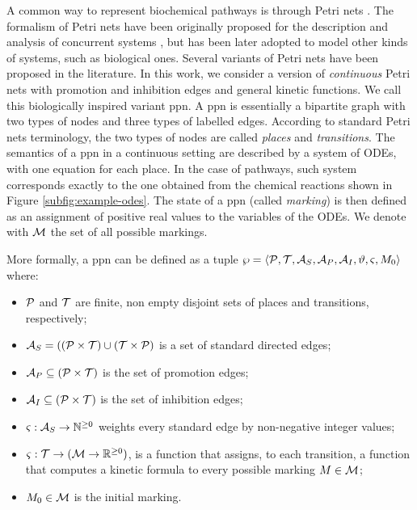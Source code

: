 

A common way to represent biochemical pathways is through Petri nets \cite{?}. The formalism of Petri nets have been originally proposed for the description and analysis of concurrent systems \cite{?}, but has been later adopted to model other kinds of systems, such as biological ones. Several variants of Petri nets have been proposed in the literature. In this work, we consider a version of \emph{continuous} Petri nets \cite{?} with promotion and inhibition edges and general kinetic functions. We call this biologically inspired variant \gls{ppn}. A \gls{ppn} is essentially a bipartite graph with two types of nodes and three types of labelled edges. According to standard Petri nets terminology, the two types of nodes are called \emph{places} and \emph{transitions}. The semantics of a \gls{ppn} in a continuous setting are described by a system of ODEs, with one equation for each place. In the case of pathways, such system corresponds exactly to the one obtained from the chemical reactions shown in Figure \ref{subfig:example-odes}. The state of a \gls{ppn} (called \emph{marking}) is then defined as an assignment of positive real values to the variables of the ODEs. We denote with $\Cal{M}$ the set of all possible markings.

More formally, a \gls{ppn} can be defined as a tuple $\wp = \Tuple{\Cal{P},\Cal{T},\Cal{A}_{S}, \Cal{A}_{P},\Cal{A}_{I},\vartheta,\varsigma,M_0}$ where:
\begin{itemize}
    \item $\Cal{P}$ and $\Cal{T}$ are finite, non empty disjoint sets of places and transitions, respectively;
    \item $\Cal{A}_{S} = ((\Cal{P}\times \Cal{T}) \cup (\Cal{T}\times \Cal{P})$ is a set of standard directed edges;
    \item $\Cal{A}_{P} \subseteq (\Cal{P} \times \Cal{T})$ is the set of promotion edges;
    \item $\Cal{A}_{I} \subseteq (\Cal{P} \times \Cal{T})$ is the set of inhibition edges;
    \item $\varsigma: \Cal{A}_{S} \shortrightarrow \mathbb{N}^{\geq 0}$ weights every standard edge by non-negative integer values;
    \item $\varsigma:\Cal{T} \shortrightarrow (\Cal{M} \rightarrow \mathbb{R}^{\geq 0})$,  is a function that assigns, to each transition, a function that computes a kinetic formula to every possible marking $M \in \Cal{M}$;
    \item $M_0 \in \Cal{M}$ is the initial marking.
\end{itemize}

